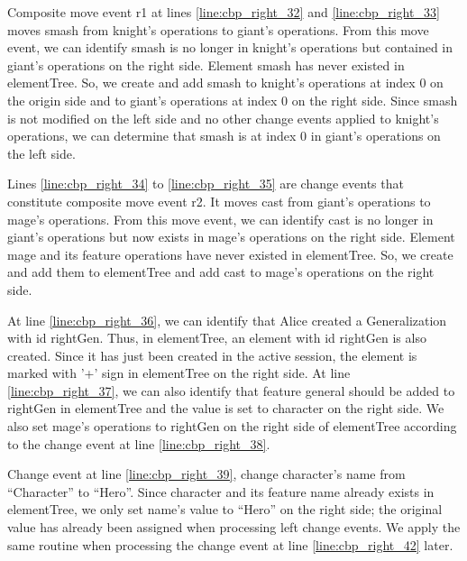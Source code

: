 Composite move event \textsf{r1} at lines \ref{line:cbp_right_32} and \ref{line:cbp_right_33} moves \textsf{smash} from \textsf{knight}'s \textsf{operations} to \textsf{giant}'s \textsf{operations}. From this move event, we can identify \textsf{smash} is no longer in \textsf{knight}'s \textsf{operations} but contained in \textsf{giant}'s \textsf{operations} on the right side. Element \textsf{smash} has never existed in \textsf{elementTree}. So, we create and add \textsf{smash} to \textsf{knight}'s \textsf{operations} at index 0 on the origin side and to \textsf{giant}'s \textsf{operations} at index 0 on the right side. Since \textsf{smash} is not modified on the left side and no other change events applied to \textsf{knight}'s \textsf{operations}, we can determine that \textsf{smash} is at index 0 in \textsf{giant}'s \textsf{operations} on the left side.

Lines \ref{line:cbp_right_34} to \ref{line:cbp_right_35} are change events that constitute composite move event \textsf{r2}.  It  moves \textsf{cast} from \textsf{giant}'s \textsf{operations} to \textsf{mage}'s \textsf{operations}. From this move event, we can identify \textsf{cast} is no longer in  \textsf{giant}'s \textsf{operations} but now exists in \textsf{mage}'s \textsf{operations} on the right side. Element \textsf{mage} and its feature \textsf{operations} have never existed in \textsf{elementTree}. So, we create and add them to \textsf{elementTree} and add \textsf{cast} to \textsf{mage}'s \textsf{operations} on the right side.

At line \ref{line:cbp_right_36}, we can identify that Alice created a \textsf{Generalization} with id \textsf{rightGen}. Thus, in \textsf{elementTree}, an element with id \textsf{rightGen} is also created. Since it has just been created in the active session, the element is marked with '+' sign in \textsf{elementTree} on the right side. At line \ref{line:cbp_right_37}, we can also identify that feature \textsf{general} should be added to \textsf{rightGen} in \textsf{elementTree} and the value is set to \textsf{character} on the right side. We also set \textsf{mage}'s \textsf{operations} to \textsf{rightGen} on the right side of  \textsf{elementTree} according to the change event at line \ref{line:cbp_right_38}. 

Change event at line \ref{line:cbp_right_39}, change \textsf{character}'s \textsf{name} from ``Character'' to ``Hero''. Since \textsf{character} and its feature \textsf{name} already exists in \textsf{elementTree}, we only set \textsf{name}'s value to ``Hero'' on the right side; the original value has already been assigned when processing left change events. We apply the same routine when processing the change event at line \ref{line:cbp_right_42} later.

